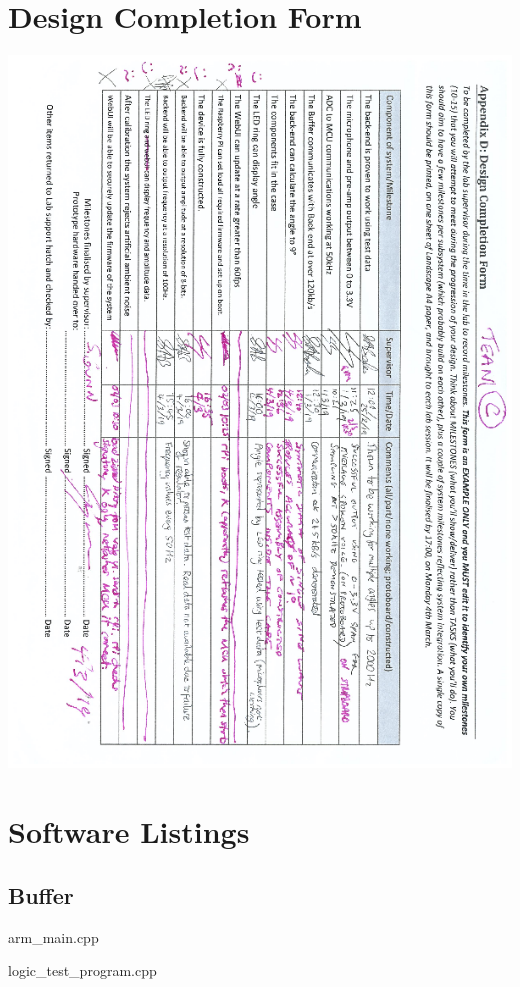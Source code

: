 \documentclass[a4paper]{article}
\begin{document}
\section{Design Completion Form}
\includegraphics[width=500pt]{appendixA/DesignCompletionForm-complete.png}

\section{Software Listings}

\subsection{Buffer}
arm\_main.cpp


logic\_test\_program.cpp

\end{document}
